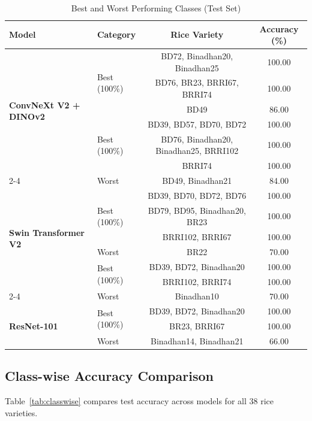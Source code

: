 \documentclass[11pt,a4paper]{article}
\begin{document}
\begin{table}[H]
\centering
\caption{Best and Worst Performing Classes (Test Set)}
\label{tab:best_worst}
\small
\begin{tabular}{llcc}
\toprule
\textbf{Model} & \textbf{Category} & \textbf{Rice Variety} & \textbf{Accuracy (\%)} \\
\midrule
\multirow{6}{*}{\textbf{ConvNeXt V2 + DINOv2}}
& \multirow{3}{*}{Best (100\%)} & BD72, Binadhan20, Binadhan25 & 100.00 \\
& & BD76, BR23, BRRI67, BRRI74 & 100.00 \\
\cmidrule{2-4}
& Worst & BD49 & 86.00 \\
\midrule
\multirow{6}{*}{\textbf{DenseNet-201}}
& \multirow{3}{*}{Best (100\%)} & BD39, BD57, BD70, BD72 & 100.00 \\
& & BD76, Binadhan20, Binadhan25, BRRI102 & 100.00 \\
& & BRRI74 & 100.00 \\
\cmidrule{2-4}
& Worst & BD49, Binadhan21 & 84.00 \\
\midrule
\multirow{6}{*}{\textbf{Swin Transformer V2}}
& \multirow{3}{*}{Best (100\%)} & BD39, BD70, BD72, BD76 & 100.00 \\
& & BD79, BD95, Binadhan20, BR23 & 100.00 \\
& & BRRI102, BRRI67 & 100.00 \\
\cmidrule{2-4}
& Worst & BR22 & 70.00 \\
\midrule
\multirow{6}{*}{\textbf{VGG-19}}
& \multirow{2}{*}{Best (100\%)} & BD39, BD72, Binadhan20 & 100.00 \\
& & BRRI102, BRRI74 & 100.00 \\
\cmidrule{2-4}
& Worst & Binadhan10 & 70.00 \\
\midrule
\multirow{6}{*}{\textbf{ResNet-101}}
& \multirow{2}{*}{Best (100\%)} & BD39, BD72, Binadhan20 & 100.00 \\
& & BR23, BRRI67 & 100.00 \\
\cmidrule{2-4}
& Worst & Binadhan14, Binadhan21 & 66.00 \\
\bottomrule
\end{tabular}
\end{table}

\subsection{Class-wise Accuracy Comparison}

Table~\ref{tab:classwise} compares test accuracy across models for all 38 rice varieties.
\end{document}

